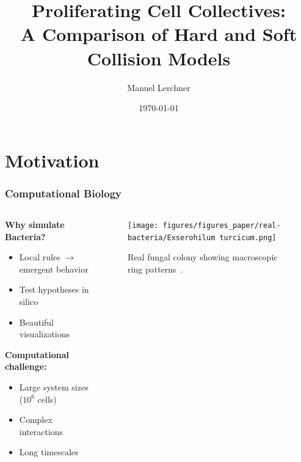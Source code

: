 \documentclass[10pt,t]{beamer}
\title{Proliferating Cell Collectives:\\ A Comparison of Hard and Soft Collision Models}
\author{Manuel Lerchner}
\date{\today}
\begin{document}
\maketitle

\setcounter{framenumber}{0}


\section{Motivation}

\begin{frame}
    \frametitle{Computational Biology}

    \begin{columns}
        \begin{column}{0.58\textwidth}
            \textbf{Why simulate Bacteria?}
            \begin{itemize}
                \item Local rules $\to$ emergent behavior
                \item Test hypotheses in silico
                \item Beautiful visualizations
            \end{itemize}

            \vspace{0.5cm}

            \textbf{Computational challenge:}
            \begin{itemize}
                \item Large system sizes ($10^6$ cells)
                \item Complex interactions
                \item Long timescales
            \end{itemize}
        \end{column}

        \begin{column}{0.5\textwidth}
            \centering
            \begin{figure}
                \centering
                \texttt{[image: figures/figures\_paper/real-bacteria/Exserohilum turcicum.png]}
                \caption*{\scriptsize{Real fungal colony showing macroscopic ring patterns~\cite{Bankole2023}.}}
            \end{figure}
        \end{column}
    \end{columns}

\end{frame}
\end{document}
